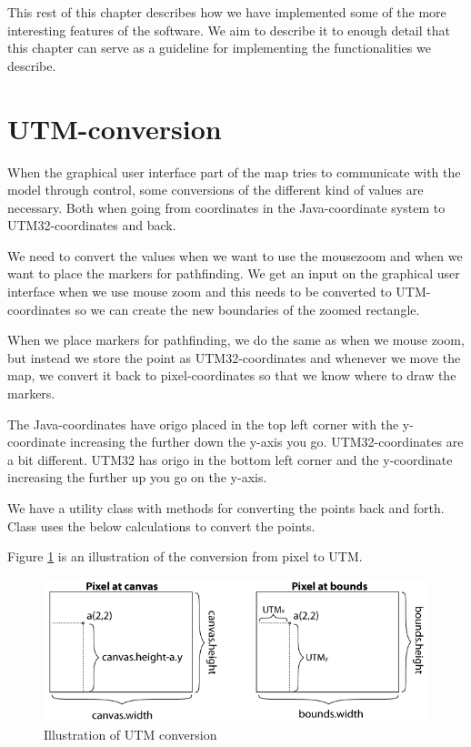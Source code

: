 This rest of this chapter describes how we have implemented some of the more
interesting features of the software. We aim to describe it to enough detail that this
chapter can serve as a guideline for implementing the functionalities we
describe.

\section{UTM-conversion}
\label{IMPL-UTM}
When the graphical user interface part of the map tries to communicate with the
model through control, some conversions of the different kind of values are
necessary. Both when going from coordinates in the Java-coordinate system to
UTM32-coordinates and back.

We need to convert the values when we want to use the mousezoom and when we want
to place the markers for pathfinding. We get an input on the graphical user
interface when we use mouse zoom and this needs to be converted to
UTM-coordinates so we can create the new boundaries of the zoomed rectangle.

When we place markers for pathfinding, we do the same as when we mouse zoom,
but instead we store the point as UTM32-coordinates and whenever we move the
map, we convert it back to pixel-coordinates so that we know where to draw the
markers.

The Java-coordinates have origo placed in the top left corner with the
y-coordinate increasing the further down the y-axis you go. UTM32-coordinates are a bit
different. UTM32 has origo in the bottom left corner and the y-coordinate
increasing the further up you go on the y-axis.

We have a utility class with methods for converting the points back and forth.
Class  uses the below calculations to convert the points.

Figure \ref{fig:UTMconversion} is an illustration of the conversion from pixel to UTM.

\begin{figure}[!ht]
\centering
\includegraphics[width=1\linewidth]{images/UTMillu}
\caption{Illustration of UTM conversion}
\label{fig:UTMconversion}
\end{figure}

